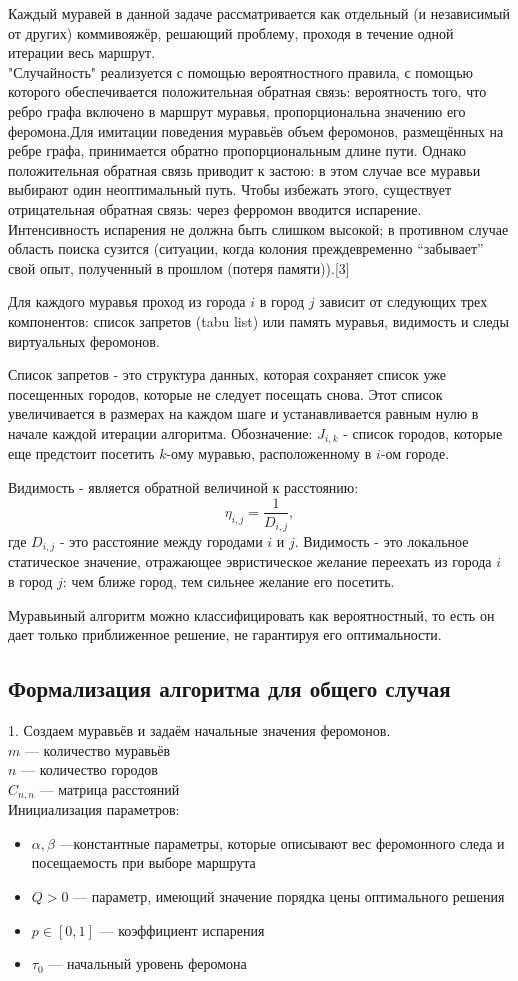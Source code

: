 \documentclass[14pt]{article}
\begin{document}
Каждый муравей в данной задаче рассматривается как отдельный (и независимый от других) коммивояжёр, решающий проблему, проходя в течение одной итерации весь маршрут.\\
"Случайность" реализуется с помощью вероятностного правила, с помощью которого обеспечивается положительная обратная связь: вероятность того, что ребро графа включено в маршрут муравья, пропорциональна значению его феромона.Для имитации поведения муравьёв объем феромонов, размещённых на ребре графа, принимается обратно пропорциональным длине пути. Однако положительная обратная связь приводит к застою: в этом случае все муравьи выбирают один неоптимальный путь. Чтобы избежать этого, существует отрицательная обратная связь: через ферромон вводится испарение. Интенсивность испарения не должна быть слишком высокой; в противном случае область поиска сузится (ситуации, когда колония преждевременно “забывает” свой опыт, полученный в прошлом (потеря памяти)).[3]

Для каждого муравья проход из города $i$ в город $j$ зависит от следующих трех компонентов: список запретов (tabu list) или память муравья, видимость и следы виртуальных феромонов.

Список запретов - это структура данных, которая сохраняет список уже посещенных городов, которые не следует посещать снова. Этот список увеличивается в размерах на каждом шаге и устанавливается равным нулю в начале каждой итерации алгоритма. Обозначение: $J_{i,k}$ - список городов, которые еще предстоит посетить $k$-ому муравью, расположенному в $i$-ом городе.

Видимость - является обратной величиной к расстоянию:
\[
\eta_{i,j} = \frac{1}{D_{i,j}},
\]
где $D_{i,j}$ - это расстояние между городами $i$ и $j$. Видимость - это локальное статическое значение, отражающее эвристическое желание переехать из города $i$ в город $j$: чем ближе город, тем сильнее желание его посетить.

Муравьиный алгоритм можно классифицировать как вероятностный, то есть он дает только приближенное решение, не гарантируя его оптимальности.

\subsection{Формализация алгоритма для общего случая}
1. Создаем муравьёв и задаём начальные значения феромонов.\\
$m$ --- количество муравьёв\\
$n$ --- количество городов\\
$C_{n,n}$ --- матрица расстояний\\
Инициализация параметров:\\
\begin{itemize}
    \item $\alpha, \beta$ ---константные параметры, которые описывают вес феромонного следа и посещаемость при выборе маршрута
    \item $Q>0$ --- параметр, имеющий значение порядка цены оптимального решения
    \item $p \in [0,1]$ --- коэффициент испарения
    \item $\tau_0$ --- начальный уровень феромона
\end{itemize}
\end{document}
